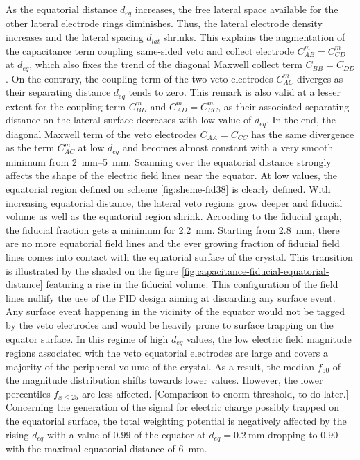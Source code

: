 As the equatorial distance $d_{eq}$ increases, the free lateral space available for the other lateral electrode rings diminishes. Thus, the lateral electrode density increases and the lateral spacing $d_{lat}$ shrinks. 
This explains the augmentation of the capacitance term coupling same-sided veto and collect electrode $C_{AB}^m=C_{CD}^m$ at $d_{eq}$, which also fixes the trend of the diagonal Maxwell collect term $C_{BB}=C_{DD}$. On the contrary, the coupling term of the two veto electrodes $C_{AC}^m$ diverges as their separating distance $d_{eq}$ tends to zero. This remark is also valid at a lesser extent for the coupling term $C_{BD}^m$ and $C_{AD}^m = C_{BC}^m$,  as their associated separating distance on the lateral surface decreases with low value of $d_{eq}$. In the end, the diagonal Maxwell term of the veto electrodes $C_{AA} = C_{CC}$ has the same divergence as the term $C_{AC}^m$ at low $d_{eq}$ and becomes almost constant with a very smooth minimum from \SIrange{2}{5}{\mm}.
Scanning over the equatorial distance strongly affects the shape of the electric field lines near the equator. At low values, the equatorial region defined on scheme \ref{fig:sheme-fid38} is clearly defined. With increasing equatorial distance, the lateral veto regions grow deeper and fiducial volume as well as the equatorial region shrink. According to the fiducial graph, the fiducial fraction gets a minimum for \SI{2.2}{\mm}. Starting from \SI{2.8}{\mm}, there are no more equatorial field lines and the ever growing fraction of fiducial field lines comes into contact with the equatorial surface of the crystal. This transition is illustrated by the shaded on the figure \ref{fig:capacitance-fiducial-equatorial-distance} featuring a rise in the fiducial volume. This configuration of the field lines nullify the use of the FID design aiming at discarding any surface event. Any surface event happening in the vicinity of the equator would not be tagged by the veto electrodes and would be heavily prone to surface trapping on the equator surface.
In this regime of high $d_{eq}$ values, the low electric field magnitude regions associated with the veto equatorial electrodes are large and covers a majority of the peripheral volume of the crystal. As a result, the median $f_{50}$ of the magnitude distribution shifts towards lower values. However, the lower percentiles $f_{x \leq 25}$ are less affected.
{\color{red} [Comparison to enorm threshold, to do later.]}
Concerning the generation of the signal for electric charge possibly trapped on the equatorial surface, the total weighting potential is negatively affected by the rising $d_{eq}$ with a value of $0.99$ of the equator at $d_{eq}=\SI{0.2}{\mm}$ dropping to $0.90$ with the maximal equatorial distance of \SI{6}{\mm}.

